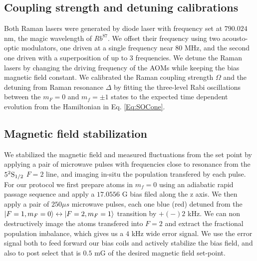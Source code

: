 
\subsection{Coupling strength and detuning calibrations}
Both Raman lasers were generated by diode laser with frequency set at $790.024$ nm, the magic wavelength of $Rb^{87}$. We offset their frequency using two acousto-optic modulators, one driven at a single frequency near 80 MHz, and the second one driven with a superposition  of up to 3 frequencies. We detune the Raman lasers by changing the driving frequency of the AOMs while keeping the bias magnetic field constant. We calibrated the Raman coupling strength $\Omega$ and the detuning from Raman resonance $\Delta$ by fitting the three-level
Rabi oscillations between the $m_F=0$ and $m_f=\pm 1$ states to the expected time dependent evolution from the Hamiltonian in Eq. \ref{Eq:SOCone}.

\subsection{Magnetic field stabilization}
We stabilized the magnetic field and measured fluctuations from the set point by applying a pair of microwave pulses with frequencies close to resonance from the $5^2{\rm S}_{1/2}$ $F=2$ line, and imaging in-situ the population transfered by each pulse. For our protocol we first prepare atoms in $m_f=0$ using an adiabatic rapid passage sequence and apply a $17.0556$ G bias filed along the z axis. We then apply a pair of $250\mu s$ microwave pulses, each one blue (red) detuned from the $|F=1,m_F=0\rangle\leftrightarrow|F=2,m_F=1\rangle $ transition by $+(-)2$ kHz. We can non destructively image the atoms transfered into $F=2$ and extract the fractional population imbalance, which gives us a $4$ kHz wide error signal. We use the error signal both to feed forward our bias coils and actively stabilize the bias field, and also to post select that is $0.5$ mG of the desired magnetic field set-point.  
 


